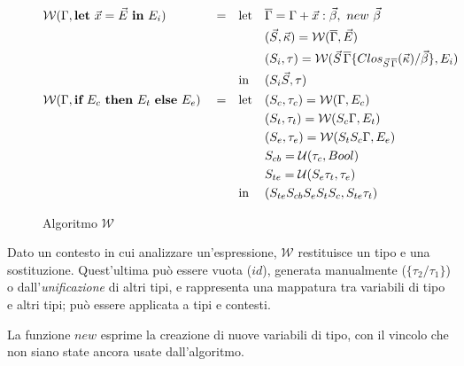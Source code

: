 \begin{figure}
\[\begin{aligned}
            \\
            \algWline{\Gamma}{\textbf{let}\ \vec{x} = \vec{E}\ \textbf{in}\ E_i}
            \begin{aligned}[t]
                 & \text{let} &  & \overline{\Gamma} = \Gamma + \vec{x} : \vec{\beta},\ new\ \vec{\beta}                                                  \\
                 &            &  & (\vec{S}, \vec{\kappa}) = \algW{\overline{\Gamma}}{\vec{E}}                                                            \\
                 &            &  & (S_i, \tau) = \algW{\vec{S}\,\overline{\Gamma} \{Clos_{\vec{S}\,\overline{\Gamma}}(\vec{\kappa}) / \vec{\beta}\}}{E_i} \\
                 & \text{in}  &  & (S_i \vec{S}, \tau)
            \end{aligned}
            \\
            \algWline{\Gamma}{\textbf{if}\ E_c\ \textbf{then}\ E_t\ \textbf{else}\ E_e}
            \begin{aligned}[t]
                 & \text{let} &  & (S_c, \tau_c) = \algW{\Gamma}{E_c}         \\
                 &            &  & (S_t, \tau_t) = \algW{S_c \Gamma}{E_t}     \\
                 &            &  & (S_e, \tau_e) = \algW{S_t S_c \Gamma}{E_e} \\
                 &            &  & S_{cb} = \mathcal{U}(\tau_c, Bool)         \\
                 &            &  & S_{te} = \mathcal{U}(S_e \tau_t, \tau_e)   \\
                 & \text{in}  &  & (S_{te} S_{cb} S_e S_t S_c, S_{te} \tau_t)
            \end{aligned}
        \end{aligned}
    \]
    \caption{Algoritmo $\mathcal{W}$}
    \label{fig:3-4-algorithm-w}
    \vspace{4mm}
\end{figure}

\noindent Dato un contesto in cui analizzare un'espressione, $\mathcal{W}$ restituisce un tipo e una sostituzione.
Quest'ultima può essere vuota ($id$), generata manualmente ($\{\tau_2 / \tau_1\}$) o dall'\textit{unificazione} di altri tipi,
e rappresenta una mappatura tra variabili di tipo e altri tipi; può essere applicata a tipi e contesti.

\noindent La funzione $new$ esprime la creazione di nuove variabili di tipo, con il vincolo che non siano state ancora usate dall'algoritmo.

